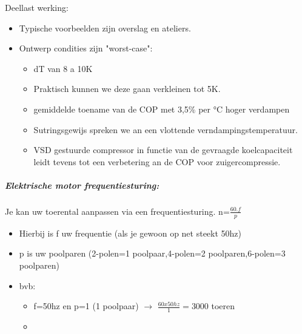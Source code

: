 \documentclass[12pt]{article}
\begin{document}
Deellast werking:\begin{itemize}
    \item Typische voorbeelden zijn overslag en ateliers.
    \item Ontwerp condities zijn "worst-case":\begin{itemize}
        \item dT van 8 a 10K
        \item Praktisch kunnen we deze gaan verkleinen tot 5K.
        \item gemiddelde toename van de COP met 3,5\% per °C hoger verdampen 
        \item Sutringsgewijs spreken we an een vlottende verndampingstemperatuur.
        \item VSD gestuurde compressor in functie van de gevraagde koelcapaciteit leidt tevens tot een verbetering an de COP voor zuigercompressie.
    \end{itemize}
\end{itemize}
\subparagraph{Elektrische motor frequentiesturing:}
Je kan uw toerental aanpassen via een frequentiesturing.
n=$\frac{60.f}{p}$\begin{itemize}
    \item Hierbij is f uw frequentie (als je gewoon op net steekt 50hz)
    \item p is uw poolparen (2-polen=1 poolpaar,4-polen=2 poolparen,6-polen=3 poolparen)
    \item bvb:\begin{itemize}
        \item f=50hz en p=1 (1 poolpaar) $\rightarrow$ $\frac{60x50hz}{1}=$3000 toeren
        \item 
    \end{itemize}
\end{itemize}
\end{document}
